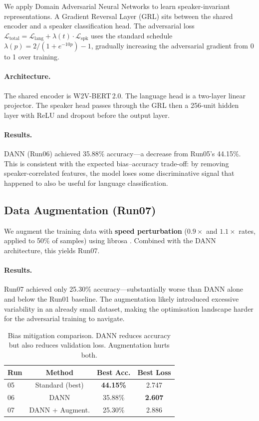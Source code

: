 \documentclass[11pt]{article}
\begin{document}
We apply Domain Adversarial Neural Networks \cite{ganin2016domain} to learn speaker-invariant representations.
A Gradient Reversal Layer (GRL) sits between the shared encoder and a speaker classification head.
The adversarial loss $\mathcal{L}_\text{total} = \mathcal{L}_\text{lang} + \lambda(t) \cdot \mathcal{L}_\text{spk}$ uses the standard schedule $\lambda(p) = 2/(1+e^{-10p})-1$, gradually increasing the adversarial gradient from 0 to 1 over training.

\paragraph{Architecture.}
The shared encoder is \textsc{W2V-BERT\,2.0}.
The language head is a two-layer linear projector.
The speaker head passes through the GRL then a 256-unit hidden layer with ReLU and dropout before the output layer.

\paragraph{Results.}
DANN (Run06) achieved 35.88\% accuracy—a decrease from Run05's 44.15\%.
This is consistent with the expected bias–accuracy trade-off: by removing speaker-correlated features, the model loses some discriminative signal that happened to also be useful for language classification.

\subsection{Data Augmentation (Run07)}

We augment the training data with \textbf{speed perturbation} ($0.9{\times}$ and $1.1{\times}$ rates, applied to 50\% of samples) using librosa \cite{mcfee2015librosa}.
Combined with the DANN architecture, this yields Run07.

\paragraph{Results.}
Run07 achieved only 25.30\% accuracy—substantially worse than DANN alone and below the Run01 baseline.
The augmentation likely introduced excessive variability in an already small dataset, making the optimisation landscape harder for the adversarial training to navigate.

\begin{table}[t]
\centering
\small
\begin{tabular}{lccc}
\toprule
\textbf{Run} & \textbf{Method} & \textbf{Best Acc.} & \textbf{Best Loss} \\
\midrule
05 & Standard (best) & \textbf{44.15\%} & 2.747 \\
06 & DANN            & 35.88\% & \textbf{2.607} \\
07 & DANN + Augment. & 25.30\% & 2.886 \\
\bottomrule
\end{tabular}
\caption{Bias mitigation comparison. DANN reduces accuracy but also reduces validation loss. Augmentation hurts both.}
\label{tab:task2}
\end{table}
\end{document}
